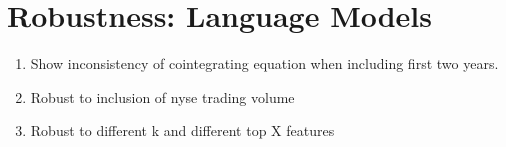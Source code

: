 \chapter{Robustness: Language Models\label{apndxA}}

\begin{enumerate}
  \item Show inconsistency of cointegrating equation when including first two years.
  \item Robust to inclusion of nyse trading volume
  \item Robust to different k and different top X features
\end{enumerate}

